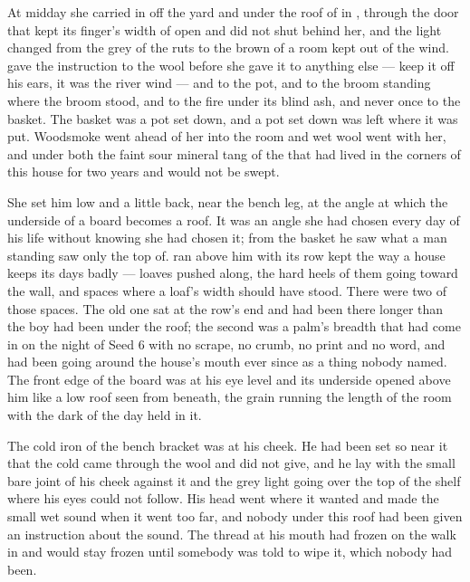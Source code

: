 At midday she carried  in off the yard and under the roof of  in , through the door that kept its finger's width of open and did not shut behind her, and the light changed from the grey of the ruts to the brown of a room kept out of the wind.  gave the instruction to the wool before she gave it to anything else --- keep it off his ears, it was the river wind --- and to the pot, and to the broom standing where the broom stood, and to the fire under its blind ash, and never once to the basket. The basket was a pot set down, and a pot set down was left where it was put. Woodsmoke went ahead of her into the room and wet wool went with her, and under both the faint sour mineral tang of the  that had lived in the corners of this house for two years and would not be swept.

She set him low and a little back, near the bench leg, at the angle at which the underside of a board becomes a roof. It was an angle she had chosen every day of his life without knowing she had chosen it; from the basket he saw what a man standing saw only the top of.  ran above him with its row kept the way a house keeps its days badly --- loaves pushed along, the hard heels of them going toward the wall, and spaces where a loaf's width should have stood. There were two of those spaces. The old one sat at the row's end and had been there longer than the boy had been under the roof; the second was a palm's breadth that had come in on the night of Seed 6 with no scrape, no crumb, no print and no word, and had been going around the house's mouth ever since as a thing nobody named. The front edge of the board was at his eye level and its underside opened above him like a low roof seen from beneath, the grain running the length of the room with the dark of the day held in it.

The cold iron of the bench bracket was at his cheek. He had been set so near it that the cold came through the wool and did not give, and he lay with the small bare joint of his cheek against it and the grey light going over the top of the shelf where his eyes could not follow. His head went where it wanted and made the small wet sound when it went too far, and nobody under this roof had been given an instruction about the sound. The thread at his mouth had frozen on the walk in and would stay frozen until somebody was told to wipe it, which nobody had been.

